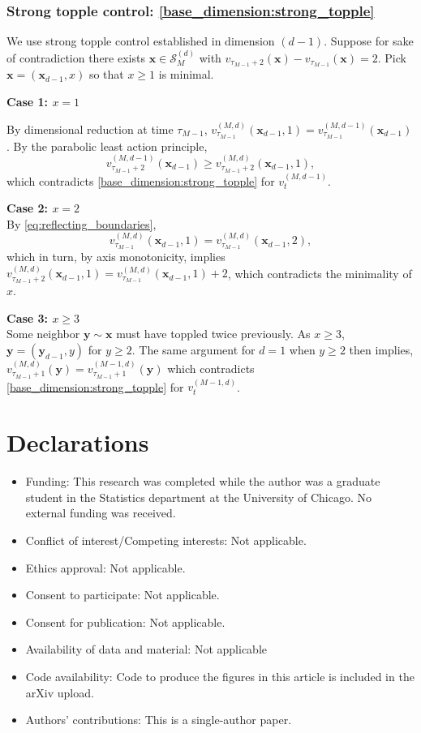 \documentclass[12pt]{amsart}
\begin{document}
\subsubsection*{Strong topple control: \eqref{base_dimension:strong_topple}}
We use strong topple control established in dimension $(d-1)$.  Suppose for sake of contradiction 
there exists $\mathbf{x} \in \mathcal{S}_M^{(d)}$ with $v_{\tau_{M-1}+2}(\mathbf{x}) - v_{\tau_{M-1}}(\mathbf{x}) = 2$.
Pick $\mathbf{x} = (\mathbf{x}_{d-1}, x)$ so that $x \geq 1$ is minimal. 

{\bf Case 1: $x = 1$}

By dimensional reduction at time $\tau_{M-1}$, $v_{\tau_{M-1}}^{(M,d)}(\mathbf{x}_{d-1},1) = v_{\tau_{M-1}}^{(M,d-1)}(\mathbf{x}_{d-1})$.
By the parabolic least action principle, 
\[
v_{\tau_{M-1}+2}^{(M,d-1)}(\mathbf{x}_{d-1}) \geq v_{\tau_{M-1}+2}^{(M,d)}(\mathbf{x}_{d-1},1),
\]
which contradicts \eqref{base_dimension:strong_topple} for $v_{t}^{(M,d-1)}$. 


{\bf Case 2: $x = 2$} \\
By \eqref{eq:reflecting_boundaries}, 
\[
v_{\tau_{M-1}}^{(M,d)}(\mathbf{x}_{d-1},1) = v_{\tau_{M-1}}^{(M,d)}(\mathbf{x}_{d-1},2),
\]
which in turn, by axis monotonicity, implies
$v_{\tau_{M-1}+2}^{(M,d)}(\mathbf{x}_{d-1},1) = v_{\tau_{M-1}}^{(M,d)}(\mathbf{x}_{d-1},1)+2$,
which contradicts the minimality of $x$.



{\bf Case 3: $x \geq 3$}  \\
Some neighbor $\mathbf{y} \sim \mathbf{x}$ must have toppled twice previously. As $x \geq 3$, $\mathbf{y} = (\mathbf{y}_{d-1}, y)$ for $y \geq 2$. The same argument for $d=1$ when $y \geq 2$ then implies, $v_{\tau_{M-1}+1}^{(M,d)}(\mathbf{y}) =  v_{\tau_{M-1}+1}^{(M-1,d)}(\mathbf{y})$ which contradicts \eqref{base_dimension:strong_topple} for $v_{t}^{(M-1,d)}$.  



\section*{Declarations}

\begin{itemize}
\item Funding: This research was completed while the author was a graduate student in the Statistics department at the University of Chicago. No external funding was received. 
\item Conflict of interest/Competing interests: Not applicable. 
\item Ethics approval: Not applicable. 
\item Consent to participate: Not applicable. 
\item Consent for publication: Not applicable. 
\item Availability of data and material: Not applicable
\item Code availability: Code to produce the figures in this article is included in the arXiv upload.
\item Authors' contributions: This is a single-author paper. 
\end{itemize}
	
	
	
	
	
\end{document}
